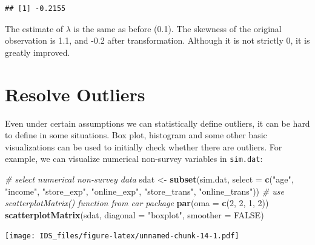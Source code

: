\documentclass[12pt,]{krantz}
\makeatletter
\newenvironment{Shaded}{\begin{snugshade}}{\end{snugshade}}
\newcommand{\CommentTok}[1]{\textcolor[rgb]{0.37,0.37,0.37}{\textit{#1}}}
\newcommand{\DataTypeTok}[1]{\textcolor[rgb]{0.27,0.27,0.27}{#1}}
\newcommand{\DecValTok}[1]{\textcolor[rgb]{0.06,0.06,0.06}{#1}}
\newcommand{\KeywordTok}[1]{\textcolor[rgb]{0.27,0.27,0.27}{\textbf{#1}}}
\newcommand{\NormalTok}[1]{#1}
\newcommand{\OperatorTok}[1]{\textcolor[rgb]{0.43,0.43,0.43}{\textbf{#1}}}
\newcommand{\OtherTok}[1]{\textcolor[rgb]{0.37,0.37,0.37}{#1}}
\newcommand{\StringTok}[1]{\textcolor[rgb]{0.5,0.5,0.5}{#1}}
\newenvironment{kframe}{%
\medskip{}
\setlength{\fboxsep}{.8em}
 \def\at@end@of@kframe{}%
 \ifinner\ifhmode%
  \def\at@end@of@kframe{\end{minipage}}%
  \begin{minipage}{\columnwidth}%
 \fi\fi%
 \def\FrameCommand##1{\hskip\@totalleftmargin \hskip-\fboxsep
 \colorbox{shadecolor}{##1}\hskip-\fboxsep
     \hskip-\linewidth \hskip-\@totalleftmargin \hskip\columnwidth}%
 \MakeFramed {\advance\hsize-\width
   \@totalleftmargin\z@ \linewidth\hsize
   \@setminipage}}%
 {\par\unskip\endMakeFramed%
 \at@end@of@kframe}
\renewenvironment{Shaded}{\begin{kframe}}{\end{kframe}}
\makeatother
\begin{document}
\begin{Shaded}
\end{Shaded}

\begin{verbatim}
## [1] -0.2155
\end{verbatim}

The estimate of \(\lambda\) is the same as before (0.1). The skewness of the original observation is 1.1, and -0.2 after transformation. Although it is not strictly 0, it is greatly improved.

\hypertarget{resolve-outliers}{%
\section{Resolve Outliers}\label{resolve-outliers}}

Even under certain assumptions we can statistically define outliers, it can be hard to define in some situations. Box plot, histogram and some other basic visualizations can be used to initially check whether there are outliers. For example, we can visualize numerical non-survey variables in \texttt{sim.dat}:

\begin{Shaded}
\begin{Highlighting}[]
\CommentTok{# select numerical non-survey data}
\NormalTok{sdat <-}\StringTok{ }\KeywordTok{subset}\NormalTok{(sim.dat, }\DataTypeTok{select =} \KeywordTok{c}\NormalTok{(}\StringTok{"age"}\NormalTok{, }\StringTok{"income"}\NormalTok{, }\StringTok{"store_exp"}\NormalTok{, }
    \StringTok{"online_exp"}\NormalTok{, }\StringTok{"store_trans"}\NormalTok{, }\StringTok{"online_trans"}\NormalTok{))}
\CommentTok{# use scatterplotMatrix() function from car package}
\KeywordTok{par}\NormalTok{(}\DataTypeTok{oma =} \KeywordTok{c}\NormalTok{(}\DecValTok{2}\NormalTok{, }\DecValTok{2}\NormalTok{, }\DecValTok{1}\NormalTok{, }\DecValTok{2}\NormalTok{))}
\KeywordTok{scatterplotMatrix}\NormalTok{(sdat, }\DataTypeTok{diagonal =} \StringTok{"boxplot"}\NormalTok{, }\DataTypeTok{smoother =} \OtherTok{FALSE}\NormalTok{)}
\end{Highlighting}
\end{Shaded}

\texttt{[image: IDS\_files/figure-latex/unnamed-chunk-14-1.pdf]}
\end{document}
